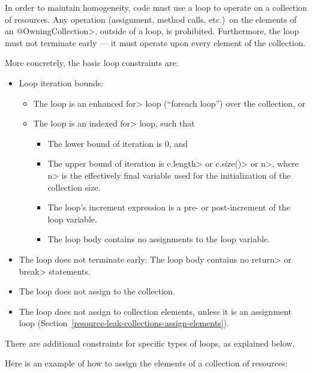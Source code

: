 
In order to maintain homogeneity, code must use a loop to operate on a
collection of resources.  Any operation (assignment, method calls, etc.)\
on the elements of an \<@OwningCollection>, outside of a loop, is
prohibited.  Furthermore, the loop must not terminate early --- it must
operate upon every element of the collection.

More concretely, the basic loop constraints are:
\begin{itemize}
\item Loop iteration bounds:
  \begin{itemize}
  \item
    The loop is an enhanced \<for> loop (``foreach loop'') over the collection, or
  \item
    The loop is an indexed \<for> loop, such that
    \begin{itemize}
    \item The lower bound of iteration is 0, and
    \item The upper bound of iteration is \<c.length> or \<c.size()> or \<n>,
      where \<n> is the effectively final variable used for the initialization of
      the collection size.
    \item The loop's increment expression is a pre- or post-increment of the
      loop variable.
    \item The loop body contains no assignments to the loop variable.
    \end{itemize}
  \end{itemize}
\item The loop does not terminate early: The loop body contains no \<return> or \<break> statements.
\item The loop does not assign to the collection.
\item The loop does not assign to collection elements, unless it is an
  assignment loop (Section~\ref{resource-leak-collections-assign-elements}).
\end{itemize}

\noindent There are additional constraints for specific types of loops, as
explained below.




Here is an example of how to assign the elements of a collection of resources:

